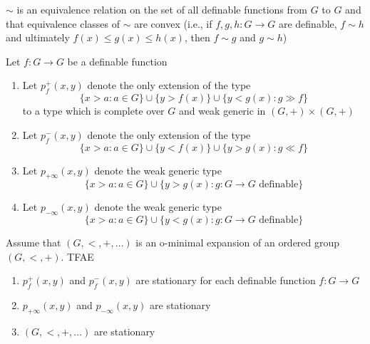 \documentclass[11pt]{article}
\begin{document}
\(\sim\) is an equivalence relation on the set of all definable functions from \(G\) to \(G\) and
that equivalence classes of \(\sim\) are convex (i.e., if \(f,g,h:G\to G\) are definable, \(f\sim h\)
and ultimately \(f(x)\le g(x)\le h(x)\), then \(f\sim g\) and \(g\sim h\))

\begin{definition}[]
Let \(f:G\to G\) be a definable function
\begin{enumerate}
\item Let \(p_f^+(x,y)\) denote the only extension of the type
\begin{equation*}
\{x>a:a\in G\}\cup\{y>f(x)\}\cup\{y<g(x):g\gg f\}
\end{equation*}
to a type which is complete over \(G\) and weak generic in \((G,+)\times(G,+)\)
\item Let \(p_f^-(x,y)\) denote the only extension of the type
\begin{equation*}
\{x>a:a\in G\}\cup\{y<f(x)\}\cup\{y>g(x):g\ll f\}
\end{equation*}
\item Let \(p_{+\infty}(x,y)\) denote the weak generic type
\begin{equation*}
\{x>a:a\in G\}\cup\{y>g(x):g:G\to G\text{ definable}\}
\end{equation*}
\item Let \(p_{-\infty}(x,y)\) denote the weak generic type
\begin{equation*}
\{x>a:a\in G\}\cup\{y<g(x):g:G\to G\text{ definable}\}
\end{equation*}
\end{enumerate}
\end{definition}

\begin{theorem}[]
Assume that \((G,<,+,\dots)\) is an o-minimal expansion of an ordered group \((G,<,+)\). TFAE
\begin{enumerate}
\item \(p_f^+(x,y)\) and \(p_f^-(x,y)\) are stationary for each definable function \(f:G\to G\)
\item \(p_{+\infty}(x,y)\) and \(p_{-\infty}(x,y)\) are stationary
\item \((G,<,+,\dots)\) are stationary
\end{enumerate}
\end{theorem}
\end{document}
